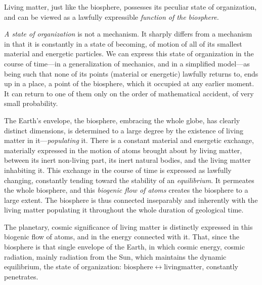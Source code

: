Living matter, just like the biosphere, possesses its peculiar state of
organization, and can be viewed as a lawfully expressible \emph{function of the
biosphere.}

\emph{A state of organization} is not a mechanism.  It sharply differs from a
mechanism in that it is constantly in a state of
becoming, of motion of
all of its smallest material and energetic particles.  We can express this
state of organization in the course of time---in a generalization of mechanics,
and in a simplified model---as being such that none of its points (material or
energetic) lawfully returns to,  ends up in a place,  a point of the biosphere, which it
occupied at any earlier moment.  It can return to one of them only on the order
of mathematical accident, of very small probability.

The Earth's envelope, the biosphere, embracing the whole globe, has clearly
distinct dimensions,  is determined to a large degree by the
existence of living matter in it---\emph{populating} it.
There is a constant material and energetic exchange, materially expressed in
the motion of atoms brought about by living matter, between its inert
non-living part, its inert natural bodies, and the living matter inhabiting it.
This exchange in the course of time is expressed as lawfully changing,
constantly tending toward the stability of an
\emph{equilibrium}.  It permeates the whole biosphere,
and this \emph{biogenic flow of atoms}
creates the biosphere to a large extent.  The biosphere is thus connected
inseparably and inherently with the living matter populating it throughout the
whole duration of geological time.

The planetary, cosmic significance of living matter is distinctly expressed in
this biogenic flow of atoms, and in the energy connected with it.  That, since
the biosphere is that single envelope of the Earth, in which cosmic energy,
cosmic radiation, mainly radiation from the Sun, which maintains the dynamic
equilibrium, the state of organization: $\mathrm{biosphere} \leftrightarrow
\mathrm{living matter}$, constantly penetrates.

